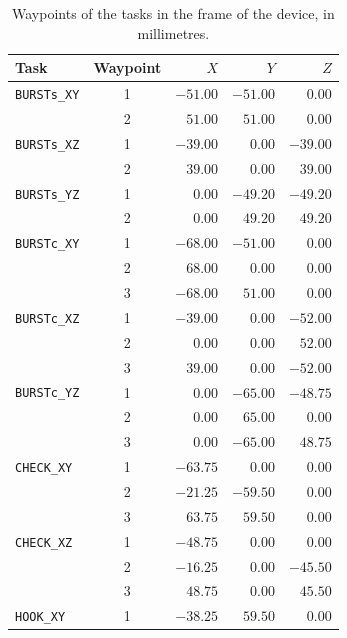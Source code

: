 \documentclass[12pt]{report}
\begin{document}
\begin{table}[htbp]
    \centering
    \caption{Waypoints of the tasks in the frame of the device, in millimetres.}
    \label{tab:task_coordinates}
    \footnotesize
    \begin{tabular}{lcrrr}
        \toprule
        Task & Waypoint & $X$ & $Y$ & $Z$\\
        \midrule
        \texttt{BURSTs\_XY} & 1 & $-51.00$ & $-51.00$ & $0.00$\\
         & 2 & $51.00$ & $51.00$ & $0.00$\\
        \addlinespace[3pt]
        \texttt{BURSTs\_XZ} & 1 & $-39.00$ & $0.00$ & $-39.00$\\
         & 2 & $39.00$ & $0.00$ & $39.00$\\
        \addlinespace[3pt]
        \texttt{BURSTs\_YZ} & 1 & $0.00$ & $-49.20$ & $-49.20$\\
         & 2 & $0.00$ & $49.20$ & $49.20$\\
        \midrule
        \texttt{BURSTc\_XY} & 1 & $-68.00$ & $-51.00$ & $0.00$\\
         & 2 & $68.00$ & $0.00$ & $0.00$\\
         & 3 & $-68.00$ & $51.00$ & $0.00$\\
        \addlinespace[3pt]
        \texttt{BURSTc\_XZ} & 1 & $-39.00$ & $0.00$ & $-52.00$\\
         & 2 & $0.00$ & $0.00$ & $52.00$\\
         & 3 & $39.00$ & $0.00$ & $-52.00$\\
        \addlinespace[3pt]
        \texttt{BURSTc\_YZ} & 1 & $0.00$ & $-65.00$ & $-48.75$\\
         & 2 & $0.00$ & $65.00$ & $0.00$\\
         & 3 & $0.00$ & $-65.00$ & $48.75$\\
        \addlinespace[3pt]
        \texttt{CHECK\_XY} & 1 & $-63.75$ & $0.00$ & $0.00$\\
         & 2 & $-21.25$ & $-59.50$ & $0.00$\\
         & 3 & $63.75$ & $59.50$ & $0.00$\\
        \addlinespace[3pt]
        \texttt{CHECK\_XZ} & 1 & $-48.75$ & $0.00$ & $0.00$\\
         & 2 & $-16.25$ & $0.00$ & $-45.50$\\
         & 3 & $48.75$ & $0.00$ & $45.50$\\
        \addlinespace[3pt]
        \texttt{HOOK\_XY} & 1 & $-38.25$ & $59.50$ & $0.00$\\

\end{tabular}
\end{table}
\end{document}
